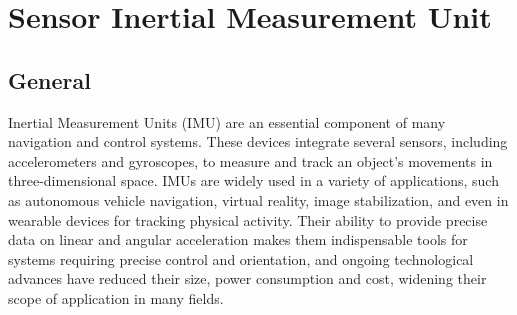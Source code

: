%
%
%
%
%
%
%
%
%
%
%
%
%


\chapter{Sensor Inertial Measurement Unit}  \label{chap:InertialMeasurementUnit}

\section{General}
Inertial Measurement Units (IMU) are an essential component of many navigation and control systems. These devices integrate several sensors, including accelerometers and gyroscopes, to measure and track an object's movements in three-dimensional space. IMUs are widely used in a variety of applications, such as autonomous vehicle navigation, virtual reality, image stabilization, and even in wearable devices for tracking physical activity. Their ability to provide precise data on linear and angular acceleration makes them indispensable tools for systems requiring precise control and orientation, and ongoing technological advances have reduced their size, power consumption and cost, widening their scope of application in many fields. 
\cite{st_lsm9ds1:2025} \cite{analogdevices:2024} \cite{wahyudi:2011}


